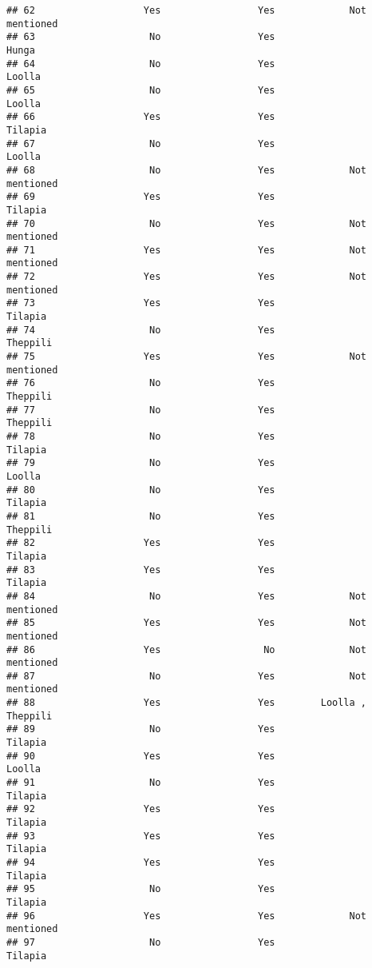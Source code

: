 \documentclass[
]{article}
\begin{document}
\begin{verbatim}
## 62                   Yes                 Yes             Not mentioned
## 63                    No                 Yes                     Hunga
## 64                    No                 Yes                   Loolla 
## 65                    No                 Yes                   Loolla 
## 66                   Yes                 Yes                  Tilapia 
## 67                    No                 Yes                   Loolla 
## 68                    No                 Yes             Not mentioned
## 69                   Yes                 Yes                  Tilapia 
## 70                    No                 Yes             Not mentioned
## 71                   Yes                 Yes             Not mentioned
## 72                   Yes                 Yes             Not mentioned
## 73                   Yes                 Yes                  Tilapia 
## 74                    No                 Yes                 Theppili 
## 75                   Yes                 Yes             Not mentioned
## 76                    No                 Yes                 Theppili 
## 77                    No                 Yes                 Theppili 
## 78                    No                 Yes                  Tilapia 
## 79                    No                 Yes                   Loolla 
## 80                    No                 Yes                  Tilapia 
## 81                    No                 Yes                 Theppili 
## 82                   Yes                 Yes                  Tilapia 
## 83                   Yes                 Yes                  Tilapia 
## 84                    No                 Yes             Not mentioned
## 85                   Yes                 Yes             Not mentioned
## 86                   Yes                  No             Not mentioned
## 87                    No                 Yes             Not mentioned
## 88                   Yes                 Yes        Loolla , Theppili 
## 89                    No                 Yes                  Tilapia 
## 90                   Yes                 Yes                   Loolla 
## 91                    No                 Yes                  Tilapia 
## 92                   Yes                 Yes                  Tilapia 
## 93                   Yes                 Yes                  Tilapia 
## 94                   Yes                 Yes                  Tilapia 
## 95                    No                 Yes                  Tilapia 
## 96                   Yes                 Yes             Not mentioned
## 97                    No                 Yes                  Tilapia 

\end{verbatim}
\end{document}
